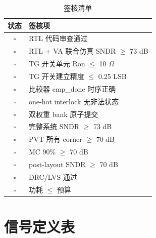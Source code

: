 \documentclass[UTF8,a4paper,11pt]{ctexart}
\providecommand{\textOmega}{\ensuremath{\Omega}}
\begin{document}
\begin{table}[H]
\centering
\caption{签核清单}
\label{tab:signoff-checklist}
\begin{tabular}{cl}
\toprule
状态 & 签核项 \\
\midrule
{$\square$} & RTL 代码审查通过 \\
{$\square$} & RTL + VA 联合仿真 SNDR $\geq$ 73 dB \\
{$\square$} & TG 开关单元 Ron $\leq$ 10 \textOmega \\
{$\square$} & TG 开关建立精度 $\leq$ 0.25 LSB \\
{$\square$} & 比较器 cmp\_done 时序正确 \\
{$\square$} & one-hot interlock 无非法状态 \\
{$\square$} & 双权重 bank 原子提交 \\
{$\square$} & 完整系统 SNDR $\geq$ 73 dB \\
{$\square$} & PVT 所有 corner $\geq$ 70 dB \\
{$\square$} & MC 90\% $\geq$ 70 dB \\
{$\square$} & post-layout SNDR $\geq$ 70 dB \\
{$\square$} & DRC/LVS 通过 \\
{$\square$} & 功耗 $\leq$ 预算 \\
\bottomrule
\end{tabular}
\end{table}

\appendix

\section{信号定义表}
\label{app:signal-defs}
\end{document}
